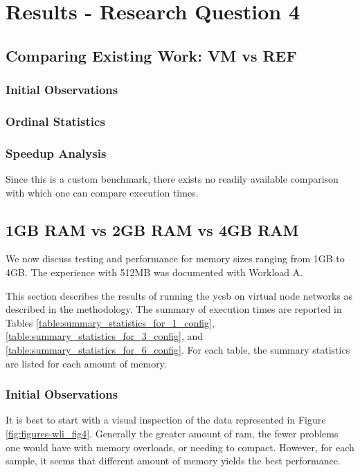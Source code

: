 \section{Results - Research Question 4}

\subsection{Comparing Existing Work: VM vs REF}

\subsubsection{Initial Observations}

\subsubsection{Ordinal Statistics}

\subsubsection{Speedup Analysis}

Since this is a custom benchmark, there exists no readily available comparison with which one can compare execution times.

\subsection{1GB RAM vs 2GB RAM vs 4GB RAM}

We now discuss testing and performance for memory sizes ranging from 1GB to 4GB.  The experience with 512MB was documented with Workload A.

This section describes the results of running the \gls{ycsb} on virtual node networks as described in the methodology.  The summary of execution times are reported in Tables \ref{table:summary_statistics_for_1_config}, \ref{table:summary_statistics_for_3_config}, and \ref{table:summary_statistics_for_6_config}.  For each table, the summary statistics are listed for each amount of memory.

\subsubsection{Initial Observations}


It is best to start with a visual inspection of the data represented in Figure \ref{fig:figures-wli_fig4}.  Generally the greater amount of \gls{ram}, the fewer problems one would have with memory overloads, or needing to compact. However, for each sample, it seems that different amount of memory yields the best performance.


